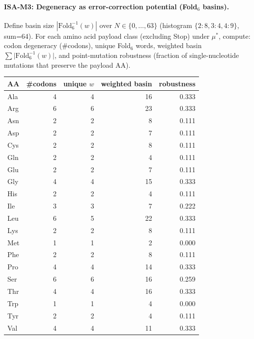 \paragraph{ISA-M3: Degeneracy as error-correction potential (Fold$_6$ basins).}
Define basin size $|\mathrm{Fold}_6^{-1}(w)|$ over $N\in\{0,\dots,63\}$ (histogram $\{2:8, 3:4, 4:9\}$, sum=64). For each amino acid payload class (excluding Stop) under $\mu^\ast$, compute: codon degeneracy (\#codons), unique Fold$_6$ words, weighted basin $\sum \lvert\mathrm{Fold}_6^{-1}(w)\rvert$, and point-mutation robustness (fraction of single-nucleotide mutations that preserve the payload AA).

\begin{center}
\scriptsize
\setlength{\tabcolsep}{6pt}
\renewcommand{\arraystretch}{1.10}
\begin{tabular}{l r r r r}
\toprule
AA & \#codons & unique $w$ & weighted basin & robustness \\
\midrule
Ala & 4 & 4 & 16 & 0.333 \\
Arg & 6 & 6 & 23 & 0.333 \\
Asn & 2 & 2 & 8 & 0.111 \\
Asp & 2 & 2 & 7 & 0.111 \\
Cys & 2 & 2 & 8 & 0.111 \\
Gln & 2 & 2 & 4 & 0.111 \\
Glu & 2 & 2 & 7 & 0.111 \\
Gly & 4 & 4 & 15 & 0.333 \\
His & 2 & 2 & 4 & 0.111 \\
Ile & 3 & 3 & 7 & 0.222 \\
Leu & 6 & 5 & 22 & 0.333 \\
Lys & 2 & 2 & 8 & 0.111 \\
Met & 1 & 1 & 2 & 0.000 \\
Phe & 2 & 2 & 8 & 0.111 \\
Pro & 4 & 4 & 14 & 0.333 \\
Ser & 6 & 6 & 16 & 0.259 \\
Thr & 4 & 4 & 16 & 0.333 \\
Trp & 1 & 1 & 4 & 0.000 \\
Tyr & 2 & 2 & 4 & 0.111 \\
Val & 4 & 4 & 11 & 0.333 \\
\bottomrule
\end{tabular}
\end{center}


